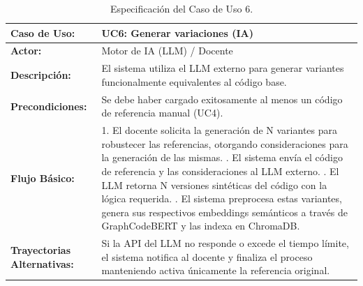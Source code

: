\begin{table}[H]
	\centering
	\begin{tabular}{|p{3cm}|p{11cm}|}
		\hline
		\rowcolor[HTML]{E7F3FF}
		\textbf{Caso de Uso:}               & \textbf{UC6: Generar variaciones (IA)}                                                                                                                              \\ \hline
		\textbf{Actor:}                     & Motor de IA (LLM) / Docente                                                                                                                                         \\ \hline
		\textbf{Descripción:}               & El sistema utiliza el LLM externo para generar variantes funcionalmente equivalentes al código base.                                                                \\ \hline
		\textbf{Precondiciones:}            & Se debe haber cargado exitosamente al menos un código de referencia manual (UC4).                                                                                   \\ \hline
		\textbf{Flujo Básico:}              &
		1. El docente solicita la generación de N variantes para robustecer las referencias, otorgando consideraciones para la generación de las mismas. \newline
		2. El sistema envía el código de referencia y las consideraciones al LLM externo. \newline
		3. El LLM retorna N versiones sintéticas del código con la lógica requerida. \newline
		4. El sistema preprocesa estas variantes, genera sus respectivos embeddings semánticos a través de GraphCodeBERT y las indexa en ChromaDB.                                                                \\ \hline
		\textbf{Trayectorias Alternativas:} & Si la API del LLM no responde o excede el tiempo límite, el sistema notifica al docente y finaliza el proceso manteniendo activa únicamente la referencia original. \\ \hline
	\end{tabular}
	\caption{Especificación del Caso de Uso 6.}
\end{table}

